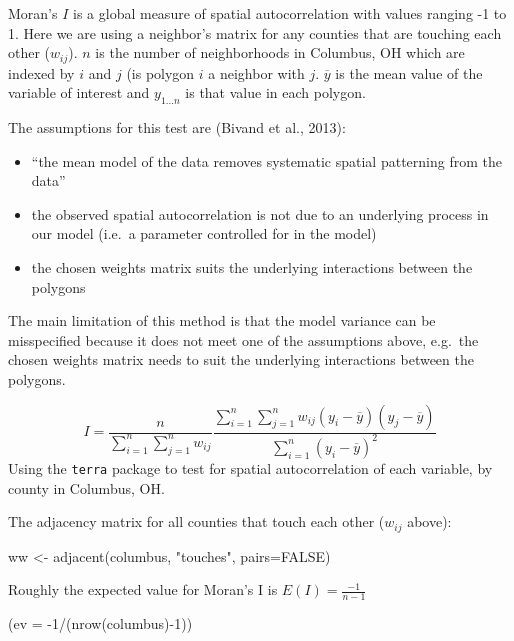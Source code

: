 \documentclass[
]{article}
\newenvironment{Shaded}{\begin{snugshade}}{\end{snugshade}}
\newcommand{\AttributeTok}[1]{\textcolor[rgb]{0.77,0.63,0.00}{#1}}
\newcommand{\ConstantTok}[1]{\textcolor[rgb]{0.00,0.00,0.00}{#1}}
\newcommand{\DecValTok}[1]{\textcolor[rgb]{0.00,0.00,0.81}{#1}}
\newcommand{\FunctionTok}[1]{\textcolor[rgb]{0.00,0.00,0.00}{#1}}
\newcommand{\NormalTok}[1]{#1}
\newcommand{\OtherTok}[1]{\textcolor[rgb]{0.56,0.35,0.01}{#1}}
\newcommand{\SpecialCharTok}[1]{\textcolor[rgb]{0.00,0.00,0.00}{#1}}
\newcommand{\StringTok}[1]{\textcolor[rgb]{0.31,0.60,0.02}{#1}}
\providecommand{\tightlist}{%
  \setlength{\itemsep}{0pt}\setlength{\parskip}{0pt}}
\begin{document}
Moran's \(I\) is a global measure of spatial autocorrelation with values
ranging -1 to 1. Here we are using a neighbor's matrix for any counties
that are touching each other (\(w_{ij}\)). \(n\) is the number of
neighborhoods in Columbus, OH which are indexed by \(i\) and \(j\) (is
polygon \(i\) a neighbor with \(j\). \(\overline{y}\) is the mean value
of the variable of interest and \(y_{1...n}\) is that value in each
polygon.

The assumptions for this test are (Bivand et al., 2013):

\begin{itemize}
\tightlist
\item
  ``the mean model of the data removes systematic spatial patterning
  from the data''\\
\item
  the observed spatial autocorrelation is not due to an underlying
  process in our model (i.e.~a parameter controlled for in the model)\\
\item
  the chosen weights matrix suits the underlying interactions between
  the polygons
\end{itemize}

The main limitation of this method is that the model variance can be
misspecified because it does not meet one of the assumptions above,
e.g.~the chosen weights matrix needs to suit the underlying interactions
between the polygons.

\[
I=\frac{n}{\sum_{i=1}^{n} \sum_{j=1}^{n} w_{ij}} \frac{\sum_{i=1}^{n} \sum_{j=1}^{n} w_{ij} (y_{i}-\overline{y}) (y_{j}-\overline{y})}{\sum_{i=1}^{n} (y_{i}-\overline{y})^{2}}
\] Using the \texttt{terra} package to test for spatial autocorrelation
of each variable, by county in Columbus, OH.

The adjacency matrix for all counties that touch each other (\(w_{ij}\)
above):

\begin{Shaded}
\begin{Highlighting}[]
\NormalTok{ww }\OtherTok{\textless{}{-}}  \FunctionTok{adjacent}\NormalTok{(columbus, }\StringTok{"touches"}\NormalTok{, }\AttributeTok{pairs=}\ConstantTok{FALSE}\NormalTok{)}
\end{Highlighting}
\end{Shaded}

Roughly the expected value for Moran's I is \(E(I)=\frac{-1}{n-1}\)

\begin{Shaded}
\begin{Highlighting}[]
\NormalTok{(}\AttributeTok{ev =} \SpecialCharTok{{-}}\DecValTok{1}\SpecialCharTok{/}\NormalTok{(}\FunctionTok{nrow}\NormalTok{(columbus)}\SpecialCharTok{{-}}\DecValTok{1}\NormalTok{))}
\end{Highlighting}
\end{Shaded}
\end{document}
